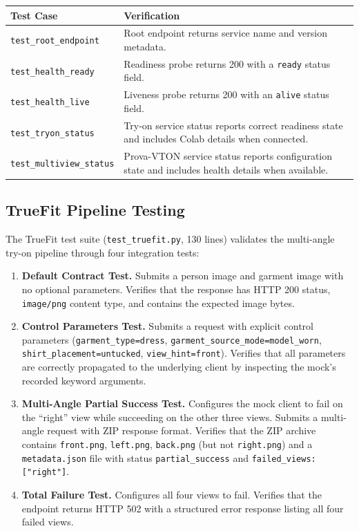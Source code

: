 \begin{longtable}{p{5cm} p{8.5cm}}
\toprule
\textbf{Test Case} & \textbf{Verification} \\
\midrule
\endfirsthead
\endhead
\bottomrule
\endfoot

\texttt{test\_root\_endpoint} & Root endpoint returns service name and version metadata. \\
\texttt{test\_health\_ready} & Readiness probe returns 200 with a \texttt{ready} status field. \\
\texttt{test\_health\_live} & Liveness probe returns 200 with an \texttt{alive} status field. \\
\texttt{test\_tryon\_status} & Try-on service status reports correct readiness state and includes Colab details when connected. \\
\texttt{test\_multiview\_status} & Prova-VTON service status reports configuration state and includes health details when available. \\
\end{longtable}
\label{tab:health-tests}

\subsection{TrueFit Pipeline Testing}

The TrueFit test suite (\texttt{test\_truefit.py}, 130 lines) validates the multi-angle try-on pipeline through four integration tests:

\begin{enumerate}[leftmargin=*]
    \item \textbf{Default Contract Test.} Submits a person image and garment image with no optional parameters. Verifies that the response has HTTP 200 status, \texttt{image/png} content type, and contains the expected image bytes.

    \item \textbf{Control Parameters Test.} Submits a request with explicit control parameters (\texttt{garment\_type=dress}, \texttt{garment\_source\_mode=model\_worn}, \texttt{shirt\_placement=untucked}, \texttt{view\_hint=front}). Verifies that all parameters are correctly propagated to the underlying client by inspecting the mock's recorded keyword arguments.

    \item \textbf{Multi-Angle Partial Success Test.} Configures the mock client to fail on the ``right'' view while succeeding on the other three views. Submits a multi-angle request with ZIP response format. Verifies that the ZIP archive contains \texttt{front.png}, \texttt{left.png}, \texttt{back.png} (but not \texttt{right.png}) and a \texttt{metadata.json} file with status \texttt{partial\_success} and \texttt{failed\_views: ["right"]}.

    \item \textbf{Total Failure Test.} Configures all four views to fail. Verifies that the endpoint returns HTTP 502 with a structured error response listing all four failed views.
\end{enumerate}

